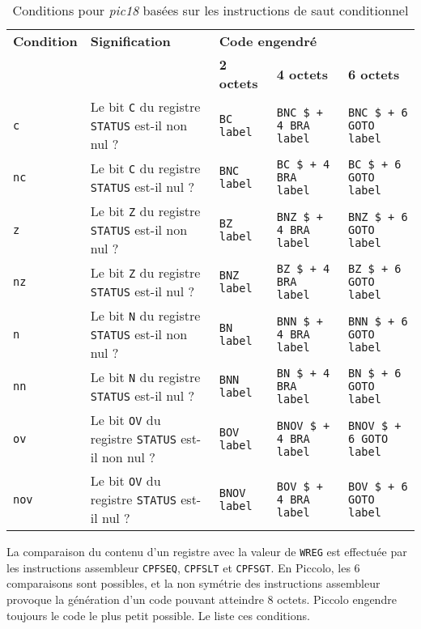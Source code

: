 \begin{table}[!ht]
  \centering
  \small
  \begin{tabular}{lp{4cm}lp{2.2cm}p{2.5cm}}
    \textbf{Condition} & \textbf{Signification} & \multicolumn{3}{l}{\bf Code engendré}\\
                       &                        & \textbf{2 octets} & \textbf{4 octets} & \textbf{6 octets}\\
    \hline
    \texttt{c} & Le bit \texttt{C} du registre \texttt{STATUS} est-il non nul ? &\texttt{BC label}  & \texttt{BNC \$ + 4 BRA label}  & \texttt{BNC \$ + 6 GOTO label} \\
    \texttt{nc} & Le bit \texttt{C} du registre \texttt{STATUS} est-il nul ? &\texttt{BNC label}  & \texttt{BC \$ + 4 BRA label}  & \texttt{BC \$ + 6 GOTO label} \\
    \texttt{z} & Le bit \texttt{Z} du registre \texttt{STATUS} est-il non nul ? &\texttt{BZ label}  & \texttt{BNZ \$ + 4 BRA label}  & \texttt{BNZ \$ + 6 GOTO label} \\
    \texttt{nz} & Le bit \texttt{Z} du registre \texttt{STATUS} est-il nul ? &\texttt{BNZ label}  & \texttt{BZ \$ + 4 BRA label}  & \texttt{BZ \$ + 6 GOTO label} \\
    \texttt{n} & Le bit \texttt{N} du registre \texttt{STATUS} est-il non nul ? &\texttt{BN label}  & \texttt{BNN \$ + 4 BRA label}  & \texttt{BNN \$ + 6 GOTO label} \\
    \texttt{nn} & Le bit \texttt{N} du registre \texttt{STATUS} est-il nul ? &\texttt{BNN label}  & \texttt{BN \$ + 4 BRA label}  & \texttt{BN \$ + 6 GOTO label} \\
    \texttt{ov} & Le bit \texttt{OV} du registre \texttt{STATUS} est-il non nul ? &\texttt{BOV label}  & \texttt{BNOV \$ + 4 BRA label}  & \texttt{BNOV \$ + 6 GOTO label} \\
    \texttt{nov} & Le bit \texttt{OV} du registre \texttt{STATUS} est-il nul ? &\texttt{BNOV label}  & \texttt{BOV \$ + 4 BRA label}  & \texttt{BOV \$ + 6 GOTO label} \\
    \hline
  \end{tabular}
  \caption{Conditions pour \emph{pic18} basées sur les instructions de saut conditionnel}
\end{table}


La comparaison du contenu d'un registre avec la valeur de \texttt{WREG} est effectuée par les instructions assembleur \texttt{CPFSEQ}, \texttt{CPFSLT} et \texttt{CPFSGT}. En Piccolo, les 6 comparaisons sont possibles, et la non symétrie des instructions assembleur provoque la génération d'un code pouvant atteindre 8 octets. Piccolo engendre toujours le code le plus petit possible. Le  liste ces conditions.

